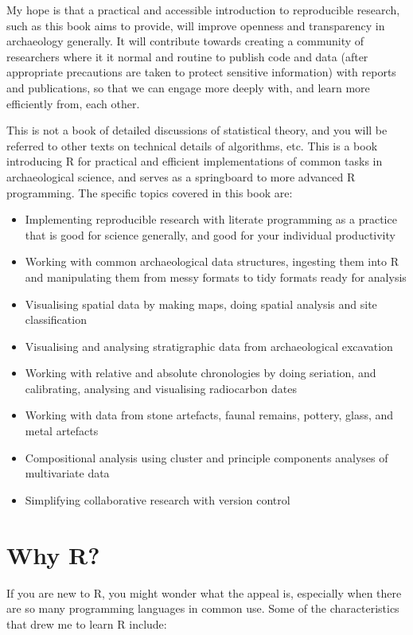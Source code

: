 \documentclass[]{book}
\begin{document}
My hope is that a practical and accessible introduction to reproducible
research, such as this book aims to provide, will improve openness and
transparency in archaeology generally. It will contribute towards
creating a community of researchers where it it normal and routine to
publish code and data (after appropriate precautions are taken to
protect sensitive information) with reports and publications, so that we
can engage more deeply with, and learn more efficiently from, each
other.

This is not a book of detailed discussions of statistical theory, and
you will be referred to other texts on technical details of algorithms,
etc. This is a book introducing R for practical and efficient
implementations of common tasks in archaeological science, and serves as
a springboard to more advanced R programming. The specific topics
covered in this book are:

\begin{itemize}
\item
  Implementing reproducible research with literate programming as a
  practice that is good for science generally, and good for your
  individual productivity
\item
  Working with common archaeological data structures, ingesting them
  into R and manipulating them from messy formats to tidy formats ready
  for analysis
\item
  Visualising spatial data by making maps, doing spatial analysis and
  site classification
\item
  Visualising and analysing stratigraphic data from archaeological
  excavation
\item
  Working with relative and absolute chronologies by doing seriation,
  and calibrating, analysing and visualising radiocarbon dates
\item
  Working with data from stone artefacts, faunal remains, pottery,
  glass, and metal artefacts
\item
  Compositional analysis using cluster and principle components analyses
  of multivariate data
\item
  Simplifying collaborative research with version control
\end{itemize}

\section{Why R?}\label{why-r}

If you are new to R, you might wonder what the appeal is, especially
when there are so many programming languages in common use. Some of the
characteristics that drew me to learn R include:
\end{document}
